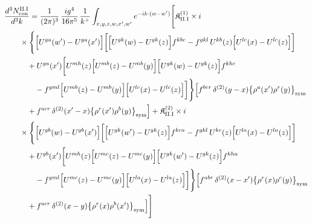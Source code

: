 \begingroup\small
\begin{align}\label{eq:H-II.I-2}
&\frac{d^{3}N^{\rm II.I}_{{\rm con}}}{d^{3}k}=\frac{1}{(2\pi)^{3}}\, \frac{ig^{4}}{16\pi^{5}}\, \frac{1}{k^{+}} \int_{x,y,z,w,x',w'}e^{-ik\cdot(w-w')}\Bigg[ \mathfrak{K}^{(1)}_{\rm II.I} \times i\notag\\
&\quad\quad \times \Bigg\{\Big[U^{ga}(w')-U^{ga}(x')\Big]\bigg[\Big[U^{gk}(w)-U^{gk}(z)\Big]f^{kbc} -f^{gkl}\, U^{kb}(z)\Big[U^{lc}(x)-U^{lc}(z)\Big]\bigg]\notag\\
&\quad\quad\quad +U^{ga}(x')\bigg[U^{mh}(z)\Big[U^{mb}(z)-U^{mb}(y)\Big]\Big[U^{gk}(w)-U^{gk}(z)\Big]f^{khc}\notag\\
&\quad\quad\quad\quad -f^{gml}\Big[U^{mb}(z)-U^{mb}(y)\Big]\Big[U^{lc}(x)-U^{lc}(z)\Big]\bigg]\Bigg\} \Big[f^{bcr}\, \delta^{(2)}(y-x)\big\{\rho^{a}(x')\rho^{r}(y)\big\}_{\rm sym}\notag\\
&\quad\quad\quad +f^{acr}\, \delta^{(2)}(x'-x)\big\{\rho^{r}(x')\rho^{b}(y)\big\}_{\rm sym}\Big] + \mathfrak{K}^{(2)}_{\rm II.I} \times i\notag\\
&\quad\quad \times \Bigg\{\Big[U^{gb}(w)-U^{gb}(x')\Big]\bigg[\Big[U^{gk}(w')-U^{gk}(z)\Big]f^{kca} -f^{gkl}\, U^{kc}(z)\Big[U^{la}(x)-U^{la}(z)\Big]\bigg]\notag\\
&\quad\quad\quad +U^{gb}(x')\bigg[U^{mh}(z)\Big[U^{mc}(z)-U^{mc}(y)\Big]\Big[U^{gk}(w')-U^{gk}(z)\Big]f^{kha}\notag\\
&\quad\quad\quad\quad -f^{gml}\Big[U^{mc}(z)-U^{mc}(y)\Big]\Big[U^{la}(x)-U^{la}(z)\Big]\bigg]\Bigg\} \Big[f^{abr}\, \delta^{(2)}(x-x')\big\{\rho^{r}(x)\rho^{c}(y)\big\}_{\rm sym}\notag\\
&\quad\quad\quad +f^{acr}\, \delta^{(2)}(x-y)\big\{\rho^{r}(x)\rho^{b}(x')\big\}_{\rm sym}\Big]\Bigg]
\end{align}
\endgroup
